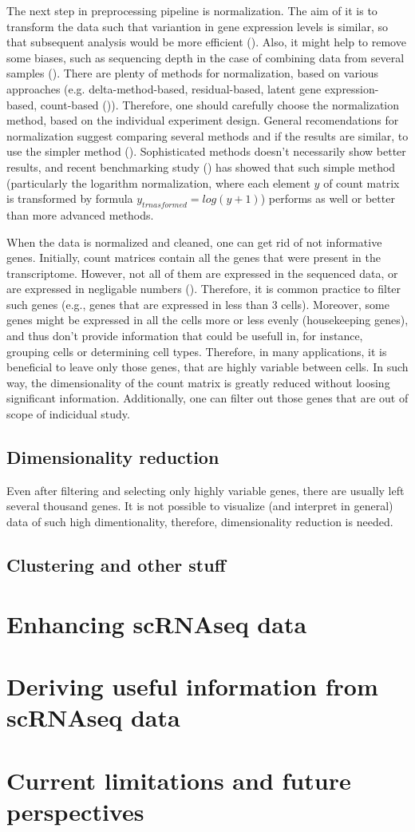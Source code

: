 The next step in preprocessing pipeline is normalization.
The aim of it is to transform the data such that variantion in gene expression levels is similar,
so that subsequent analysis would be more efficient (\cite{Ahlmann2023}).
Also, it might help to remove some biases,
such as sequencing depth in the case of combining data from several samples (\cite{Lingen2024}).
There are plenty of methods for normalization, based on various approaches
(e.g. delta-method-based, residual-based, latent gene expression-based, count-based (\cite{Ahlmann2023})).
Therefore, one should carefully choose the normalization method, based on the individual experiment design.
General recomendations for normalization suggest comparing several methods and if the results are similar,
to use the simpler method (\cite{Lingen2024}).
Sophisticated methods doesn't necessarily show better results, and recent benchmarking study (\cite{Ahlmann2023})
has showed that such simple method (particularly the logarithm normalization,
where each element $y$ of count matrix is transformed by formula $y_{trnasformed} = log(y+1)$)
performs as well or better than more advanced methods.

When the data is normalized and cleaned, one can get rid of not informative genes.
Initially, count matrices contain all the genes that were present in the transcriptome.
However, not all of them are expressed in the sequenced data, or are expressed in negligable numbers (\cite{Heumos2023}).
Therefore, it is common practice to filter such genes (e.g., genes that are expressed in less than 3 cells).
Moreover, some genes might be expressed in all the cells more or less evenly (housekeeping genes),
and thus don't provide information that could be usefull in, for instance, grouping cells or determining cell types.
Therefore, in many applications, it is beneficial to leave only those genes, that are highly variable between cells.
In such way, the dimensionality of the count matrix is greatly reduced without loosing significant information.
Additionally, one can filter out those genes that are out of scope of indicidual study.

\subsection{Dimensionality reduction}

Even after filtering and selecting only highly variable genes, there are usually left several thousand genes.
It is not possible to visualize (and interpret in general) data of such high dimentionality, therefore,
dimensionality reduction is needed.

\subsection{Clustering and other stuff}

\section{Enhancing scRNAseq data}

\section{Deriving useful information from scRNAseq data}

\section{Current limitations and future perspectives}

